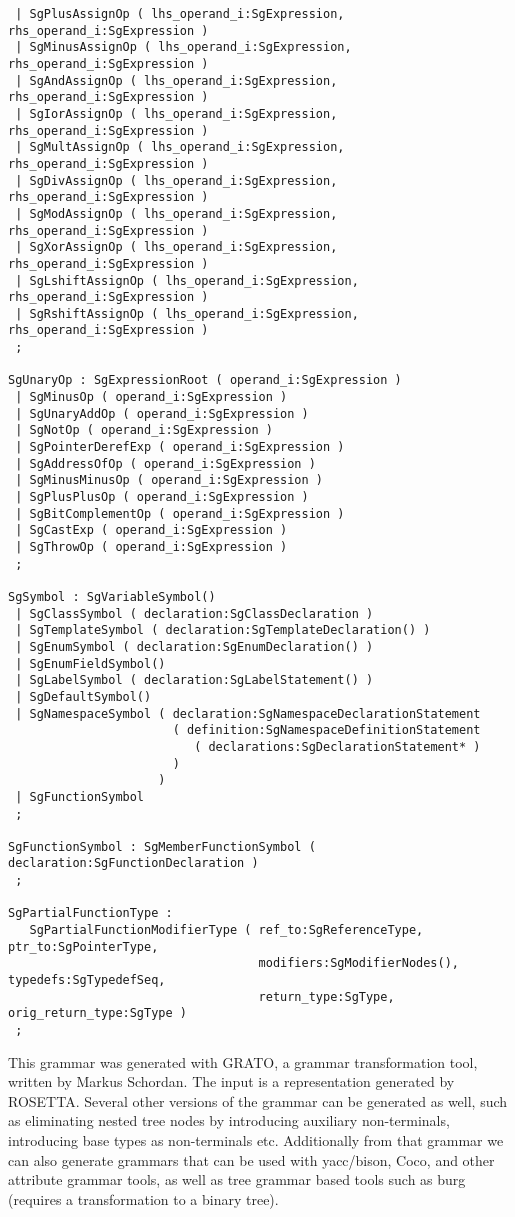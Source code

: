 \begin{verbatim}
 | SgPlusAssignOp ( lhs_operand_i:SgExpression, rhs_operand_i:SgExpression )
 | SgMinusAssignOp ( lhs_operand_i:SgExpression, rhs_operand_i:SgExpression )
 | SgAndAssignOp ( lhs_operand_i:SgExpression, rhs_operand_i:SgExpression )
 | SgIorAssignOp ( lhs_operand_i:SgExpression, rhs_operand_i:SgExpression )
 | SgMultAssignOp ( lhs_operand_i:SgExpression, rhs_operand_i:SgExpression )
 | SgDivAssignOp ( lhs_operand_i:SgExpression, rhs_operand_i:SgExpression )
 | SgModAssignOp ( lhs_operand_i:SgExpression, rhs_operand_i:SgExpression )
 | SgXorAssignOp ( lhs_operand_i:SgExpression, rhs_operand_i:SgExpression )
 | SgLshiftAssignOp ( lhs_operand_i:SgExpression, rhs_operand_i:SgExpression )
 | SgRshiftAssignOp ( lhs_operand_i:SgExpression, rhs_operand_i:SgExpression )
 ;

SgUnaryOp : SgExpressionRoot ( operand_i:SgExpression )
 | SgMinusOp ( operand_i:SgExpression )
 | SgUnaryAddOp ( operand_i:SgExpression )
 | SgNotOp ( operand_i:SgExpression )
 | SgPointerDerefExp ( operand_i:SgExpression )
 | SgAddressOfOp ( operand_i:SgExpression )
 | SgMinusMinusOp ( operand_i:SgExpression )
 | SgPlusPlusOp ( operand_i:SgExpression )
 | SgBitComplementOp ( operand_i:SgExpression )
 | SgCastExp ( operand_i:SgExpression )
 | SgThrowOp ( operand_i:SgExpression )
 ;

SgSymbol : SgVariableSymbol()
 | SgClassSymbol ( declaration:SgClassDeclaration )
 | SgTemplateSymbol ( declaration:SgTemplateDeclaration() )
 | SgEnumSymbol ( declaration:SgEnumDeclaration() )
 | SgEnumFieldSymbol()
 | SgLabelSymbol ( declaration:SgLabelStatement() )
 | SgDefaultSymbol()
 | SgNamespaceSymbol ( declaration:SgNamespaceDeclarationStatement 
                       ( definition:SgNamespaceDefinitionStatement 
                          ( declarations:SgDeclarationStatement* ) 
                       ) 
                     )
 | SgFunctionSymbol
 ;

SgFunctionSymbol : SgMemberFunctionSymbol ( declaration:SgFunctionDeclaration )
 ;

SgPartialFunctionType : 
   SgPartialFunctionModifierType ( ref_to:SgReferenceType, ptr_to:SgPointerType, 
                                   modifiers:SgModifierNodes(), typedefs:SgTypedefSeq, 
                                   return_type:SgType, orig_return_type:SgType )
 ;

\end{verbatim}

This grammar was generated with GRATO, a grammar transformation tool,
written by Markus Schordan. The input is a representation generated by
ROSETTA. Several other versions of the grammar can be generated as
well, such as eliminating nested tree nodes by introducing auxiliary
non-terminals, introducing base types as non-terminals etc. Additionally from
that grammar we can also generate grammars that can be used with yacc/bison, Coco, and other attribute grammar tools, as well as tree grammar based tools such as burg (requires a transformation to a binary tree).

